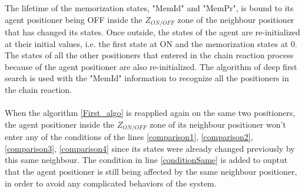 \documentclass[]{spie}  %
\begin{document}
	 The lifetime of the memorization states, "MemId" and "MemPr", is bound to its agent positioner being OFF inside the $Z_{ON/OFF}$ zone of the neighbour positioner that has changed its states. Once outside, the states of the agent are re-initialized at their initial values, i.e. the first state at ON and the memorization states at 0. The states of all the other positioners that entered in the chain reaction process because of the agent positioner are also re-initialized. The algorithm of deep first search is used with the "MemId" information to recognize all the positioners in the chain reaction.\\\\
	When the algorithm \ref{First_algo} is reapplied again on the same two positioners, the agent positioner inside the $Z_{ON/OFF}$ zone of its neighbour positioner won't enter any of the conditions of the lines \ref{comparison1}, \ref{comparison2}, \ref{comparison3}, \ref{comparison4}  since its states were already changed previously by this same neighbour. The condition in line \ref{conditionSame} is added to ouptut that the agent positioner is still being affected by the same neighbour positioner, in order to avoid any complicated behaviors of the system.  

	
\end{document}
